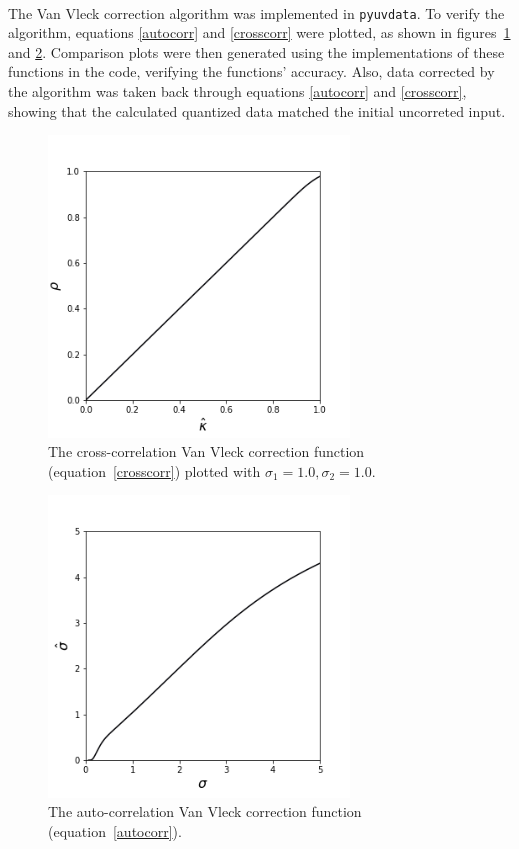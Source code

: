 \documentclass[11pt]{article}
\begin{document}
\paragraph{}
The Van Vleck correction algorithm was implemented in \texttt{pyuvdata}. To verify the algorithm, equations \ref{autocorr} and \ref{crosscorr} were plotted, as shown in figures~\ref{corrplot} and \ref{sig}. Comparison plots were then generated using the implementations of these functions in the code, verifying the functions' accuracy. Also, data corrected by the algorithm was taken back through equations \ref{autocorr} and \ref{crosscorr}, showing that the calculated quantized data matched the initial uncorreted input.

\begin{figure}
\centering{}
\includegraphics[width=80mm]{corrtestplot4.png}
\caption{The cross-correlation Van Vleck correction function (equation~\ref{crosscorr}) plotted with $\sigma_1=1.0, \sigma_2=1.0$.\label{corrplot}}
\end{figure}

\begin{figure}
\centering{}
\includegraphics[width=80mm]{sigmatestplot4.png}
\caption{The auto-correlation Van Vleck correction function (equation~\ref{autocorr}).\label{sig}}
\end{figure}
\end{document}
